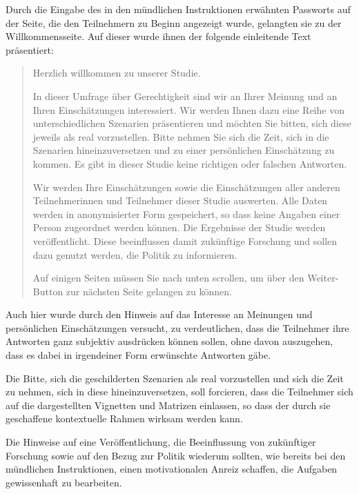 \documentclass[a4paper]{thesis}
\begin{document}
Durch die Eingabe des in den mündlichen Instruktionen erwähnten Passworts auf der Seite, die den Teilnehmern zu Beginn angezeigt wurde, gelangten sie zu der Willkommensseite. Auf dieser wurde ihnen der folgende einleitende Text präsentiert:

\begin{quote}
Herzlich willkommen zu unserer Studie.

In dieser Umfrage über Gerechtigkeit sind wir an Ihrer Meinung und an Ihren Einschätzungen interessiert. Wir werden Ihnen dazu eine Reihe von unterschiedlichen Szenarien präsentieren und möchten Sie bitten, sich diese jeweils als real vorzustellen. Bitte nehmen Sie sich die Zeit, sich in die Szenarien hineinzuversetzen und zu einer persönlichen Einschätzung zu kommen. Es gibt in dieser Studie keine richtigen oder falschen Antworten.

Wir werden Ihre Einschätzungen sowie die Einschätzungen aller anderen Teilnehmerinnen und Teilnehmer dieser Studie auswerten. Alle Daten werden in anonymisierter Form gespeichert, so dass keine Angaben einer Person zugeordnet werden können. Die Ergebnisse der Studie werden veröffentlicht. Diese beeinflussen damit zukünftige Forschung und sollen dazu genutzt werden, die Politik zu informieren.

Auf einigen Seiten müssen Sie nach unten scrollen, um über den Weiter-Button zur nächsten Seite gelangen zu können.
\end{quote}

Auch hier wurde durch den Hinweis auf das Interesse an Meinungen und persönlichen Einschätzungen versucht, zu verdeutlichen, dass die Teilnehmer ihre Antworten ganz subjektiv ausdrücken können sollen, ohne davon auszugehen, dass es dabei in irgendeiner Form erwünschte Antworten gäbe.

Die Bitte, sich die geschilderten Szenarien als real vorzustellen und sich die Zeit zu nehmen, sich in diese hineinzuversetzen, soll forcieren, dass die Teilnehmer sich auf die dargestellten Vignetten und Matrizen einlassen, so dass der durch sie geschaffene kontextuelle Rahmen wirksam werden kann.

Die Hinweise auf eine Veröffentlichung, die Beeinflussung von zukünftiger Forschung sowie auf den Bezug zur Politik wiederum sollten, wie bereits bei den mündlichen Instruktionen, einen motivationalen Anreiz schaffen, die Aufgaben gewissenhaft zu bearbeiten.
\end{document}
